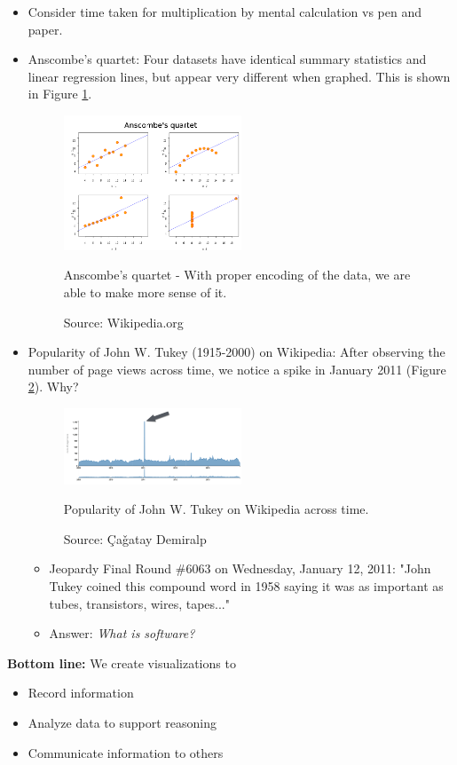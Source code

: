 \begin{itemize}
	\item Consider time taken for multiplication by mental calculation vs pen and paper.
	\item Anscombe's quartet: Four datasets have identical summary statistics and linear regression lines, but appear very different when graphed. This is shown in Figure \ref{fig:anscombes_quartet}.
	\begin{figure}[ht]
		\begin{center}
			\includegraphics[width=0.5\textwidth]{figures/anscombes_quartet.png}
			\caption{
				Anscombe's quartet - With proper encoding of the data, we are able to make more sense of it.}
			\caption*{Source: Wikipedia.org}
			\label{fig:anscombes_quartet}
		\end{center}
	\end{figure}
	\item Popularity of John W. Tukey (1915-2000) on Wikipedia: After observing the number of page views across time, we notice a spike in January 2011 (Figure \ref{fig:john_tukey}). Why?
	\begin{figure}[ht]
		\begin{center}
			\includegraphics[width=0.5\textwidth]{figures/john_tukey.png}
			\caption{
				Popularity of John W. Tukey on Wikipedia across time.}
			\caption*{Source: \c{C}a\v{g}atay Demiralp}
			\label{fig:john_tukey}
		\end{center}
	\end{figure}
	\begin{itemize}
		\item Jeopardy Final Round $\#$6063 on Wednesday, January 12, 2011: "John Tukey coined this compound word in 1958 saying it was as important as tubes, transistors, wires, tapes..."
		\item Answer: \emph{What is software?}
	\end{itemize}	
\end{itemize}
\textbf{Bottom line:} We create visualizations to
\begin{itemize}
	\item Record information
	\item Analyze data to support reasoning
	\item Communicate information to others
\end{itemize}

